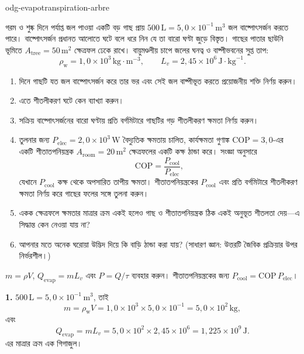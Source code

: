 \begin{exo}{odg-evapotranspiration-arbre}

গরম ও শুষ্ক দিনে পর্যাপ্ত জল পাওয়া একটি বড় গাছ প্রায় $500\,\text{L}=5{,}0\times10^{-1}\,\text{m}^3$ জল বাষ্পোৎসর্জন করতে পারে। বাষ্পোৎসর্জন প্রধানত আলোতে ঘটে বলে ধরে নিন যে তা বারো ঘণ্টা জুড়ে বিস্তৃত। গাছের পাতার ছাউনি ভূমিতে $A_{\mathrm{tree}}=50\,\text{m}^2$ ক্ষেত্রফল ঢেকে রাখে। বায়ুমণ্ডলীয় চাপে জলের ঘনত্ব ও বাষ্পীভবনের সুপ্ত তাপ:
\[
\rho_{\mathrm{w}}=1{,}0\times10^3\,\text{kg}\!\cdot\!\text{m}^{-3},
\qquad L_v=2{,}45\times10^6\,\text{J}\!\cdot\!\text{kg}^{-1}.
\]

\begin{enumerate}
  \item দিনে গাছটি যত জল বাষ্পোৎসর্জন করে তার ভর এবং সেই জল বাষ্পীভূত করতে প্রয়োজনীয় শক্তি নির্ণয় করুন।
  \item এতে শীতলীকরণ ঘটে কেন ব্যাখ্যা করুন।
  \item সক্রিয় বাষ্পোৎসর্জনের বারো ঘণ্টায় প্রতি বর্গমিটারে গাছটির গড় শীতলীকরণ ক্ষমতা নির্ণয় করুন।
  \item তুলনার জন্য $P_{\mathrm{elec}}=2{,}0\times10^3\,\text{W}$ বৈদ্যুতিক ক্ষমতায় চালিত, কার্যক্ষমতা গুণাঙ্ক $\mathrm{COP}=3{,}0$-এর একটি শীতাতপনিয়ন্ত্রক $A_{\mathrm{room}}=20\,\text{m}^2$ ক্ষেত্রফলের একটি কক্ষ ঠান্ডা করে। সংজ্ঞা অনুসারে
\[
\mathrm{COP}=\frac{P_{\mathrm{cool}}}{P_{\mathrm{elec}}},
\]
যেখানে $P_{\mathrm{cool}}$ কক্ষ থেকে অপসারিত তাপীয় ক্ষমতা। শীতাতপনিয়ন্ত্রকের $P_{\mathrm{cool}}$ এবং প্রতি বর্গমিটারে শীতলীকরণ ক্ষমতা নির্ণয় করে গাছের ফলের সঙ্গে তুলনা করুন।
  \item একক ক্ষেত্রফলে ক্ষমতার মাত্রার ক্রম একই হলেও গাছ ও শীতাতপনিয়ন্ত্রক ঠিক একই অনুভূত শীতলতা দেয়—এ সিদ্ধান্ত কেন নেওয়া যায় না?
  \item আপনার মতে অনেক ঘরোয়া উদ্ভিদ দিয়ে কি বাড়ি ঠান্ডা করা যায়? (সাধারণ জ্ঞান: উত্তরটি জৈবিক প্রক্রিয়ার উপর নির্ভরশীল।)
\end{enumerate}

\begin{indication}
$m=\rho V$, $Q_{\mathrm{evap}}=mL_v$ এবং $P=Q/\tau$ ব্যবহার করুন। শীতাতপনিয়ন্ত্রকের জন্য $P_{\mathrm{cool}}=\mathrm{COP}\,P_{\mathrm{elec}}$।
\end{indication}

\begin{solution}
\textbf{1.} $500\,\text{L}=5{,}0\times10^{-1}\,\text{m}^3$, তাই
\[
m=\rho_{\mathrm{w}}V=1{,}0\times10^3\times5{,}0\times10^{-1}=5{,}0\times10^2\,\text{kg},
\]
এবং
\[
Q_{\mathrm{evap}}=mL_v=5{,}0\times10^2\times2{,}45\times10^6=1{,}225\times10^9\,\text{J}.
\]
এর মাত্রার ক্রম এক গিগাজুল।


\end{solution}
\end{exo}
